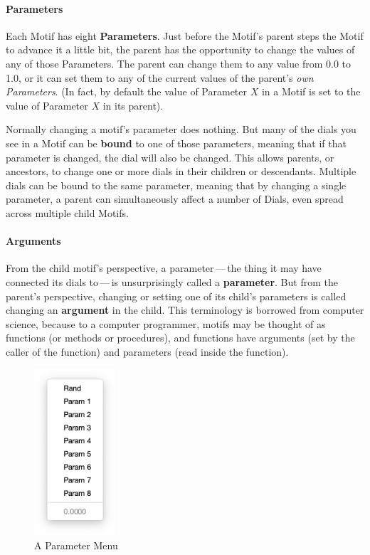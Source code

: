 \documentclass[twoside,10pt]{article}
\begin{document}
\paragraph{Parameters} Each Motif has eight {\bf Parameters}.   Just before the Motif's parent steps the Motif to advance it a little bit, the parent has the opportunity to change the values of any of those Parameters.  The parent can change them to any value from 0.0 to 1.0, or it can set them to any of the current values of the parent's {\it own Parameters}.  (In fact, by default the value of Parameter \(X\) in a Motif is set to the value of Parameter \(X\) in its parent).

Normally changing a motif's parameter does nothing.  But many of the dials you see in a Motif can be {\bf bound} to one of those parameters, meaning that if that parameter is changed, the dial will also be changed.  This allows parents, or ancestors, to change one or more dials in their children or descendants.  Multiple dials can be bound to the same parameter, meaning that by changing a single parameter, a parent can simultaneously affect a number of Dials, even spread across multiple child Motifs.

\paragraph{Arguments}

From the child motif's perspective, a parameter\,---\,the thing it may have connected its dials to\,---\,is unsurprisingly called a {\bf parameter}.  But from the parent's perspective, changing or setting one of its child's parameters is called changing an {\bf argument} in the child.  This terminology is borrowed from computer science, because to a computer programmer, motifs may be thought of as functions (or methods or procedures), and functions have arguments (set by the caller of the function) and parameters (read inside the function).


\begin{figure}
\vspace{-4em}
\includegraphics[width=1.2in]{params}
\vspace{-1em}
\caption{A Parameter Menu}
\label{params}
\vspace{-3em}
\end{figure}
\end{document}
